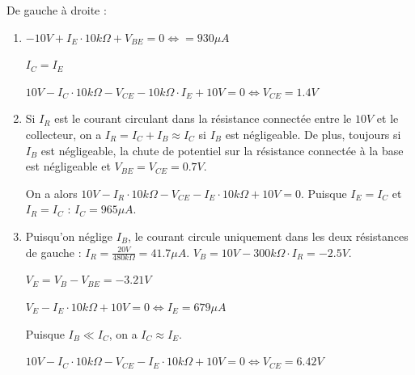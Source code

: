 \documentclass{../../template/tp}
\author{GEI}
\begin{document}




{
De gauche à droite :
\begin{enumerate}
    \item $-10 V + I_E \cdot 10k\Omega + V_{BE} = 0 \Leftrightarrow = 930 \mu A$

    $I_C = I_E$

    $ 10 V - I_C \cdot 10k\Omega - V_{CE} - 10k\Omega \cdot I_E + 10V = 0 \Leftrightarrow V_{CE} = 1.4 V$

    \item Si $I_R$ est le courant circulant dans la résistance connectée entre le $10 V$ et le collecteur, on a $I_R = I_C + I_B \approx I_C$ si $I_B$ est négligeable.
    De plus, toujours si $I_B$ est négligeable, la chute de potentiel sur la résistance connectée à la base est négligeable et $V_{BE} = V_{CE} = 0.7 V$.

    On a alors $10 V - I_R \cdot 10 k\Omega - V_{CE} - I_E \cdot 10 k\Omega + 10 V = 0$. Puisque $I_E = I_C$ et $I_R = I_C$ : $I_C = 965 \mu A$.

    \item Puisqu'on néglige $I_B$, le courant circule uniquement dans les deux résistances de gauche : $I_R = \frac{20V}{480k\Omega} = 41.7\mu A$. $V_B = 10V - 300k\Omega \cdot I_R = -2.5 V$.

    $V_E = V_B - V_{BE} = -3.21 V$

    $V_E - I_E\cdot 10k\Omega + 10 V = 0 \Leftrightarrow I_E = 679 \mu A$

    Puisque $I_B \ll I_C$, on a $I_C \approx I_E$.

    $10 V - I_C\cdot 10k\Omega - V_{CE} - I_E \cdot 10k\Omega + 10 V = 0 \Leftrightarrow V_{CE} = 6.42 V$
\end{enumerate}
}
\end{document}
